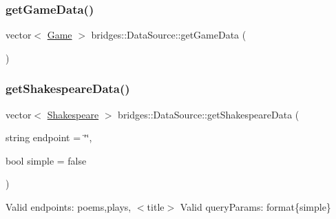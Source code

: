 \subsubsection{\texorpdfstring{get\+Game\+Data()}{getGameData()}}
{\footnotesize\ttfamily vector$<$ \hyperlink{classbridges_1_1_game}{Game} $>$ bridges\+::\+Data\+Source\+::get\+Game\+Data (\begin{DoxyParamCaption}{ }\end{DoxyParamCaption})}

\hypertarget{namespacebridges_1_1_data_source_abdf2e4d709e9b7f1a5370726676d86ec}{}\label{namespacebridges_1_1_data_source_abdf2e4d709e9b7f1a5370726676d86ec} 
\subsubsection{\texorpdfstring{get\+Shakespeare\+Data()}{getShakespeareData()}}
{\footnotesize\ttfamily vector$<$ \hyperlink{classbridges_1_1_shakespeare}{Shakespeare} $>$ bridges\+::\+Data\+Source\+::get\+Shakespeare\+Data (\begin{DoxyParamCaption}\item[{string}]{endpoint = {\ttfamily \char`\"{}\char`\"{}},  }\item[{bool}]{simple = {\ttfamily false} }\end{DoxyParamCaption})}

Valid endpoints\+: \textquotesingle{}poems\textquotesingle{},\textquotesingle{}plays\textquotesingle{}, $<$title$>$ Valid query\+Params\+: format\{simple\} 